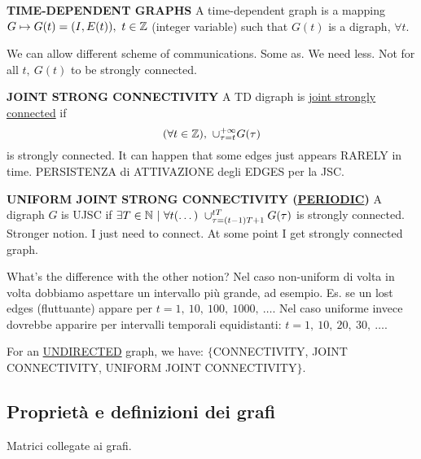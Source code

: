 \begin{defn}{\textbf{TIME-DEPENDENT GRAPHS}} \newline
A time-dependent graph is a mapping $G \mapsto G(t) = (I,E(t)),\ t \in \mathbb{Z}$ (integer variable) such that $G(t)$ is a digraph, $\forall t$.
\end{defn}

We can allow different scheme of communications. 
Some as. We need less. Not for all $t,\ G(t)$ to be strongly connected.

\begin{defn}{\textbf{JOINT STRONG CONNECTIVITY}} \newline
A TD digraph is \underline{joint strongly connected} if
\[
	(\forall t \in \Z),\ \cup_{\tau=t}^{+\infty}{G(\tau)}
\]
is strongly connected. It can happen that some edges just appears RARELY in time. PERSISTENZA di ATTIVAZIONE degli EDGES per la JSC.
\end{defn}

\begin{defn}{\textbf{UNIFORM JOINT STRONG CONNECTIVITY (\underline{PERIODIC})}} \newline
A digraph $G$ is UJSC if $\exists T \in \mathbb{N}\ |\ \forall t (\dots)\ \cup_{\tau=(t-1)T+1}^{tT}{G(\tau)}$ is strongly connected. Stronger notion. I just need to connect. At some point I get strongly connected graph.
\end{defn}

What's the difference with the other notion? Nel caso non-uniform di volta in volta dobbiamo aspettare un intervallo più grande, ad esempio. Es. se un lost edges (fluttuante) appare per $t=1,\ 10,\ 100,\ 1000,\ \dots$. Nel caso uniforme invece dovrebbe apparire per intervalli temporali equidistanti: $t=1,\ 10,\ 20,\ 30,\ \dots$.

For an \underline{UNDIRECTED} graph, we have: $\{$CONNECTIVITY, JOINT CONNECTIVITY, UNIFORM JOINT CONNECTIVITY$\}$.

\subsection{Proprietà e definizioni dei grafi}

Matrici collegate ai grafi.


